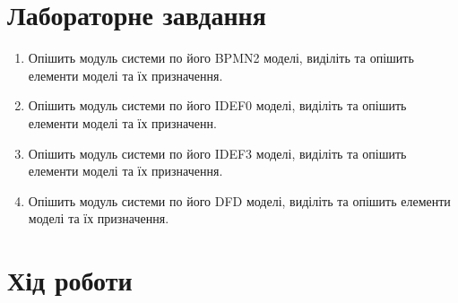 \documentclass[oneside,14pt]{extarticle}
\begin{document}
\begin{normalsize}
    \section*{Лабораторне завдання}
    \begin{enumerate}
    	\item Опішить модуль системи по його BPMN2 моделі, виділіть та опішить елементи моделі та їх призначення.
    	\item Опішить модуль системи по його IDEF0 моделі, виділіть та опішить елементи моделі та їх призначенн.
    	\item Опішить модуль системи по його IDEF3 моделі, виділіть та опішить елементи моделі та їх призначення.
    	\item Опішить модуль системи по його DFD моделі, виділіть та опішить елементи моделі та їх призначення.
    \end{enumerate}
    
    \section*{Хід роботи}
    

\end{normalsize}
\end{document}
